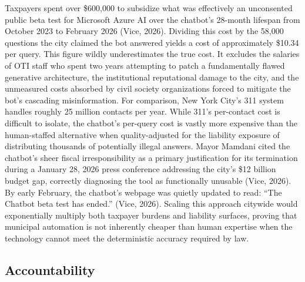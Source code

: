 \documentclass[10pt, twocolumn]{article}
\begin{document}
Taxpayers spent over \$600,000 to subsidize what was effectively an unconsented public beta test for Microsoft Azure AI over the chatbot's 28-month lifespan from October 2023 to February 2026 (Vice, 2026). Dividing this cost by the 58,000 questions the city claimed the bot answered yields a cost of approximately \$10.34 per query. This figure wildly underestimates the true cost. It excludes the salaries of OTI staff who spent two years attempting to patch a fundamentally flawed generative architecture, the institutional reputational damage to the city, and the unmeasured costs absorbed by civil society organizations forced to mitigate the bot's cascading misinformation. For comparison, New York City's 311 system handles roughly 25 million contacts per year. While 311's per-contact cost is difficult to isolate, the chatbot's per-query cost is vastly more expensive than the human-staffed alternative when quality-adjusted for the liability exposure of distributing thousands of potentially illegal answers. Mayor Mamdani cited the chatbot's sheer fiscal irresponsibility as a primary justification for its termination during a January 28, 2026 press conference addressing the city's \$12 billion budget gap, correctly diagnosing the tool as functionally unusable (Vice, 2026). By early February, the chatbot's webpage was quietly updated to read: ``The Chatbot beta test has ended.'' (Vice, 2026). Scaling this approach citywide would exponentially multiply both taxpayer burdens and liability surfaces, proving that municipal automation is not inherently cheaper than human expertise when the technology cannot meet the deterministic accuracy required by law.

\subsection*{Accountability}
\end{document}
